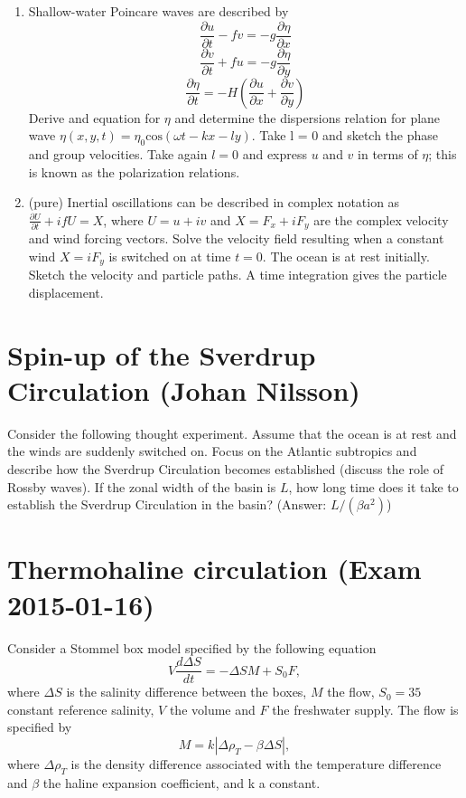 \documentclass[a4paper,11pt]{article}
\begin{document}
\begin{enumerate}
\item Shallow-water Poincare waves are described by
\begin{equation}
\frac{\partial u}{\partial t}-fv = -g\frac{\partial \eta}{\partial x}
\end{equation}
\begin{equation}
\frac{\partial v}{\partial t}+fu = -g\frac{\partial \eta}{\partial y}
\end{equation}
\begin{equation}
\frac{\partial \eta}{\partial t} = -H\left(\frac{\partial u}{\partial x} + \frac{\partial v}{\partial y}\right)
\end{equation}
Derive and equation for $\eta$ and determine the dispersions relation for plane wave $\eta(x, y, t) = \eta_{0} \text{cos}(\omega t - kx - ly)$. Take l = 0 and sketch the phase and group velocities. Take again $l = 0$ and express $u$ and $v$ in terms of $\eta$; this is known as the polarization relations. 

\item (pure) Inertial oscillations can be described in complex notation as $\frac{\partial U}{\partial t} + ifU = X$, where $U = u+iv$ and $X = F_{x} +iF_{y}$ are the complex velocity and wind forcing vectors. Solve the velocity field resulting when a constant wind $X = iF_{y}$ is switched on at time $t = 0$. The ocean is at rest initially. Sketch the velocity and particle paths. A time integration gives the particle displacement.
\end{enumerate}

\section{Spin-up of the Sverdrup Circulation (Johan Nilsson)}
Consider the following thought experiment. Assume that the ocean is at rest and the winds are suddenly switched on. Focus on the Atlantic subtropics and describe how the Sverdrup Circulation becomes established (discuss the role of Rossby waves). If the zonal width of the basin is $L$, how long time does it take to establish the Sverdrup Circulation in the basin? (Answer: $L/(\beta a^{2})$)

\section{Thermohaline circulation (Exam 2015-01-16)}
Consider a Stommel box model specified by the following equation
\begin{equation}
V \frac{d\Delta S}{dt} = -\Delta S M + S_{0}F,
\end{equation}
where $\Delta S$ is the salinity difference between the boxes, $M$ the flow, $S_{0} = 35$ constant reference salinity, $V$ the volume and $F$ the freshwater supply. The flow is specified by
\begin{equation}
M=k|\Delta \rho_{T} -\beta \Delta S|,
\end{equation}
 where $\Delta \rho_{T}$ is the density difference associated with the temperature difference and $\beta$ the haline expansion coefficient, and k a constant.
\end{document}
